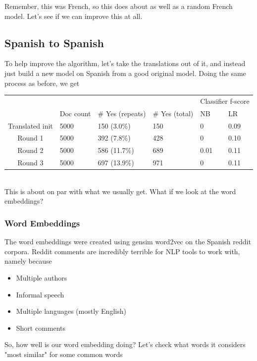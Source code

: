 \documentclass[11pt]{article} %
\begin{document}
Remember, this was French, so this does about as well as a random French model. Let's see if we can improve this at all.

\subsection{Spanish to Spanish}

To help improve the algorithm, let's take the translations out of it, and instead just build a new model on Spanish from a good original model. Doing the same process as before, we get \\

\begin{tabular}{|c|l|l|l|l|l|}
\rowcolor{gray!50} &&&& \multicolumn{2}{|c|}{Classifier f-score} \\
\rowcolor{gray!50} & Doc count & \# Yes (repeats) & \# Yes (total) & NB & LR \\
Translated init & 5000 & 150 (3.0\%) & 150 & 0 & 0.09 \\
Round 1 & 5000 &  392 (7.8\%) & 428 & 0 & 0.10 \\
Round 2 & 5000 & 586 (11.7\%)& 689 & 0.01 & 0.11 \\
Round 3 & 5000 & 697 (13.9\%) & 971 & 0 & 0.11
\end{tabular} \\

This is about on par with what we usually get. What if we look at the word embeddings?

\subsubsection{Word Embeddings}

The word embeddings were created using gensim word2vec on the Spanish reddit corpora. Reddit comments are incredibly terrible for NLP tools to work with, namely because
\begin{itemize}
\item Multiple authors \\
\item Informal speech \\
\item Multiple languages (mostly English) \\
\item Short comments\end{itemize}

So, how well is our word embedding doing? Let's check what words it considers "most similar" for some common words
\end{document}
